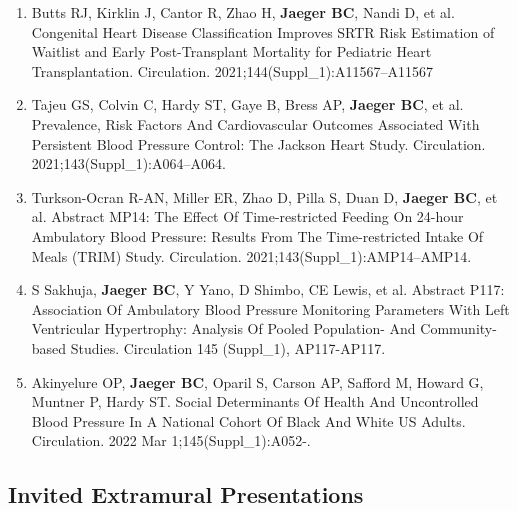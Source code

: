 \documentclass[11pt]{cv_wakeforest_article}
\newcommand{\AR}[1]{#1}  %
\newcommand{\mysubsection}[1]{\subsection*{#1}}
\newcommand{\me}{{\bfseries Jaeger BC}}
\begin{document}
\begin{enumerate}
\item Butts RJ, Kirklin J, Cantor R, Zhao H, \me, Nandi D, et al. \AR{Congenital Heart Disease Classification Improves SRTR Risk Estimation of Waitlist and Early Post-Transplant Mortality for Pediatric Heart Transplantation}. Circulation. 2021;144(Suppl\_1):A11567--A11567

\item Tajeu GS, Colvin C, Hardy ST, Gaye B, Bress AP, \me, et al. \AR{Prevalence, Risk Factors And Cardiovascular Outcomes Associated With Persistent Blood Pressure Control: The Jackson Heart Study.} Circulation. 2021;143(Suppl\_1):A064--A064.

\item Turkson-Ocran R-AN, Miller ER, Zhao D, Pilla S, Duan D, \me, et al. Abstract MP14: \AR{The Effect Of Time-restricted Feeding On 24-hour Ambulatory Blood Pressure: Results From The Time-restricted Intake Of Meals (TRIM) Study.} Circulation. 2021;143(Suppl\_1):AMP14--AMP14.

\item S Sakhuja, \me, Y Yano, D Shimbo, CE Lewis, et al. Abstract P117: \AR{Association Of Ambulatory Blood Pressure Monitoring Parameters With Left Ventricular Hypertrophy: Analysis Of Pooled Population- And Community-based Studies.} Circulation 145 (Suppl\_1), AP117-AP117.

\item Akinyelure OP, \me, Oparil S, Carson AP, Safford M, Howard G, Muntner P, Hardy ST. \AR{Social Determinants Of Health And Uncontrolled Blood Pressure In A National Cohort Of Black And White US Adults.} Circulation. 2022 Mar 1;145(Suppl\_1):A052-.

\end{enumerate}

\mysubsection{Invited Extramural Presentations}
\end{document}
